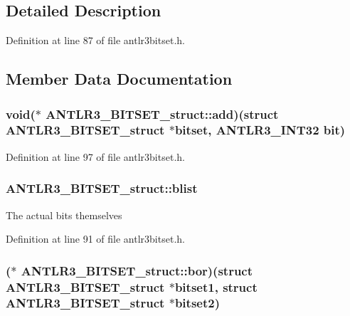 \subsection{Detailed Description}


Definition at line 87 of file antlr3bitset.\-h.



\subsection{Member Data Documentation}
\hypertarget{struct_a_n_t_l_r3___b_i_t_s_e_t__struct_acafdf986cd95396e1f22e41f1e59c46a}{
\subsubsection[{add}]{\setlength{\rightskip}{0pt plus 5cm}void($\ast$ A\-N\-T\-L\-R3\-\_\-\-B\-I\-T\-S\-E\-T\-\_\-struct\-::add)(struct {\bf A\-N\-T\-L\-R3\-\_\-\-B\-I\-T\-S\-E\-T\-\_\-struct} $\ast$bitset, {\bf A\-N\-T\-L\-R3\-\_\-\-I\-N\-T32} bit)}}\label{struct_a_n_t_l_r3___b_i_t_s_e_t__struct_acafdf986cd95396e1f22e41f1e59c46a}


Definition at line 97 of file antlr3bitset.\-h.

\hypertarget{struct_a_n_t_l_r3___b_i_t_s_e_t__struct_ae602429f83ab8519882b446e81f7167b}{
\subsubsection[{blist}]{ A\-N\-T\-L\-R3\-\_\-\-B\-I\-T\-S\-E\-T\-\_\-struct\-::blist}}\label{struct_a_n_t_l_r3___b_i_t_s_e_t__struct_ae602429f83ab8519882b446e81f7167b}
The actual bits themselves 

Definition at line 91 of file antlr3bitset.\-h.

\hypertarget{struct_a_n_t_l_r3___b_i_t_s_e_t__struct_a244506d05f6346631b9437b5f4aad2e4}{
\subsubsection[{bor}]{($\ast$ A\-N\-T\-L\-R3\-\_\-\-B\-I\-T\-S\-E\-T\-\_\-struct\-::bor)(struct {\bf A\-N\-T\-L\-R3\-\_\-\-B\-I\-T\-S\-E\-T\-\_\-struct} $\ast$bitset1, struct {\bf A\-N\-T\-L\-R3\-\_\-\-B\-I\-T\-S\-E\-T\-\_\-struct} $\ast$bitset2)}}\label{struct_a_n_t_l_r3___b_i_t_s_e_t__struct_a244506d05f6346631b9437b5f4aad2e4}


